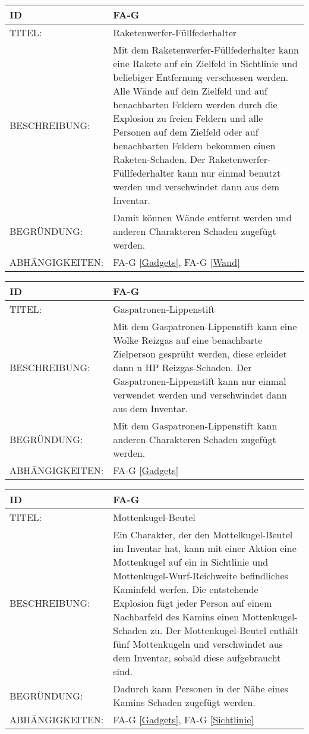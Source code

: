 \begin{tabularx}{16cm}{l|X}
	{table}\label{Raketenwerfer-Fuellfederhalter}
	\textbf{ID} & \textbf{FA-G \arabic{table}} \\
	\hline
	TITEL: & Raketenwerfer-Füllfederhalter \\
	\hline
	BESCHREIBUNG: & Mit dem Raketenwerfer-Füllfederhalter kann eine Rakete auf ein Zielfeld in Sichtlinie und beliebiger Entfernung verschossen werden. Alle Wände auf dem Zielfeld und auf benachbarten Feldern werden durch die Explosion zu freien Feldern und alle Personen auf dem Zielfeld oder auf benachbarten Feldern bekommen einen Raketen-Schaden. Der Raketenwerfer-Füllfederhalter kann nur einmal benutzt werden und verschwindet dann aus dem Inventar. \\
	\hline
	BEGRÜNDUNG: &  Damit können Wände entfernt werden und anderen Charakteren Schaden zugefügt werden. \\
	\hline
	ABHÄNGIGKEITEN: & FA-G \ref{Gadgets}, FA-G \ref{Wand} \\
\end{tabularx}

\begin{tabularx}{16cm}{l|X}
	{table}\label{Gaspatronen-Lippenstift}
	\textbf{ID} & \textbf{FA-G \arabic{table}} \\
	\hline
	TITEL: & Gaspatronen-Lippenstift \\
	\hline
	BESCHREIBUNG: & Mit dem Gaspatronen-Lippenstift kann eine Wolke Reizgas auf eine benachbarte Zielperson gesprüht werden, diese erleidet dann n HP Reizgas-Schaden. Der Gaspatronen-Lippenstift kann nur einmal verwendet werden und verschwindet dann aus dem Inventar. \\
	\hline
	BEGRÜNDUNG: &  Mit dem Gaspatronen-Lippenstift kann anderen Charakteren Schaden zugefügt werden. \\
	\hline
	ABHÄNGIGKEITEN: & FA-G \ref{Gadgets} \\
\end{tabularx}

\begin{tabularx}{16cm}{l|X}
	{table}\label{Mottenkugel-Beutel}
	\textbf{ID} & \textbf{FA-G \arabic{table}} \\
	\hline
	TITEL: & Mottenkugel-Beutel \\
	\hline
	BESCHREIBUNG: & Ein Charakter, der den Mottelkugel-Beutel im Inventar hat, kann mit einer Aktion eine Mottenkugel auf ein in Sichtlinie und Mottenkugel-Wurf-Reichweite befindliches Kaminfeld werfen. Die entstehende Explosion fügt jeder Person auf einem Nachbarfeld des Kamins einen Mottenkugel-Schaden zu. Der Mottenkugel-Beutel enthält fünf Mottenkugeln und verschwindet aus dem Inventar, sobald diese aufgebraucht sind. \\
	\hline
	BEGRÜNDUNG: &  Dadurch kann Personen in der Nähe eines Kamins Schaden zugefügt werden. \\
	\hline
	ABHÄNGIGKEITEN: & FA-G \ref{Gadgets}, FA-G \ref{Sichtlinie} \\
\end{tabularx}

